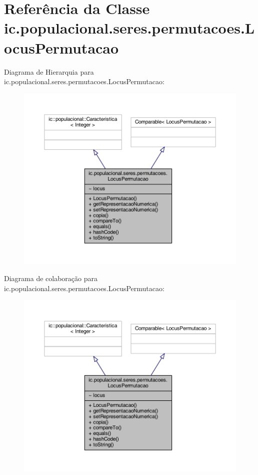 \hypertarget{classic_1_1populacional_1_1seres_1_1permutacoes_1_1_locus_permutacao}{\section{Referência da Classe ic.\-populacional.\-seres.\-permutacoes.\-Locus\-Permutacao}
\label{classic_1_1populacional_1_1seres_1_1permutacoes_1_1_locus_permutacao}
}


Diagrama de Hierarquia para ic.\-populacional.\-seres.\-permutacoes.\-Locus\-Permutacao\-:
\nopagebreak
\begin{figure}[H]
\begin{center}
\leavevmode
\includegraphics[width=350pt]{classic_1_1populacional_1_1seres_1_1permutacoes_1_1_locus_permutacao__inherit__graph}
\end{center}
\end{figure}


Diagrama de colaboração para ic.\-populacional.\-seres.\-permutacoes.\-Locus\-Permutacao\-:
\nopagebreak
\begin{figure}[H]
\begin{center}
\leavevmode
\includegraphics[width=350pt]{classic_1_1populacional_1_1seres_1_1permutacoes_1_1_locus_permutacao__coll__graph}
\end{center}
\end{figure}
